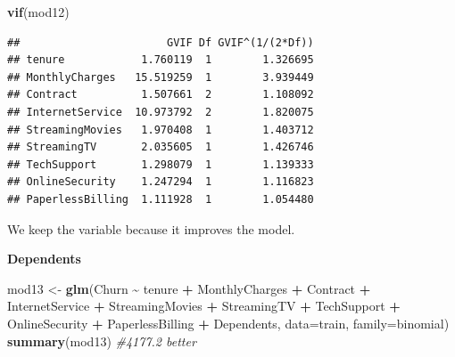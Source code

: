 \documentclass[
  twoside]{article}
\newenvironment{Shaded}{\begin{snugshade}}{\end{snugshade}}
\newcommand{\AttributeTok}[1]{\textcolor[rgb]{0.13,0.29,0.53}{#1}}
\newcommand{\CommentTok}[1]{\textcolor[rgb]{0.56,0.35,0.01}{\textit{#1}}}
\newcommand{\FunctionTok}[1]{\textcolor[rgb]{0.13,0.29,0.53}{\textbf{#1}}}
\newcommand{\NormalTok}[1]{#1}
\newcommand{\OtherTok}[1]{\textcolor[rgb]{0.56,0.35,0.01}{#1}}
\newcommand{\SpecialCharTok}[1]{\textcolor[rgb]{0.81,0.36,0.00}{\textbf{#1}}}
\begin{document}
\begin{Shaded}
\begin{Highlighting}[]
\FunctionTok{vif}\NormalTok{(mod12)}
\end{Highlighting}
\end{Shaded}

\begin{verbatim}
##                       GVIF Df GVIF^(1/(2*Df))
## tenure            1.760119  1        1.326695
## MonthlyCharges   15.519259  1        3.939449
## Contract          1.507661  2        1.108092
## InternetService  10.973792  2        1.820075
## StreamingMovies   1.970408  1        1.403712
## StreamingTV       2.035605  1        1.426746
## TechSupport       1.298079  1        1.139333
## OnlineSecurity    1.247294  1        1.116823
## PaperlessBilling  1.111928  1        1.054480
\end{verbatim}

We keep the variable because it improves the model.

\textbf{Dependents}

\begin{Shaded}
\begin{Highlighting}[]
\NormalTok{mod13 }\OtherTok{\textless{}{-}} \FunctionTok{glm}\NormalTok{(Churn }\SpecialCharTok{\textasciitilde{}}\NormalTok{ tenure }\SpecialCharTok{+}\NormalTok{ MonthlyCharges }\SpecialCharTok{+}\NormalTok{ Contract }\SpecialCharTok{+}\NormalTok{ InternetService }\SpecialCharTok{+} 
\NormalTok{               StreamingMovies }\SpecialCharTok{+}\NormalTok{ StreamingTV }\SpecialCharTok{+}\NormalTok{ TechSupport }\SpecialCharTok{+}\NormalTok{ OnlineSecurity }\SpecialCharTok{+} 
\NormalTok{               PaperlessBilling }\SpecialCharTok{+}\NormalTok{ Dependents, }\AttributeTok{data=}\NormalTok{train, }\AttributeTok{family=}\NormalTok{binomial)}
\FunctionTok{summary}\NormalTok{(mod13) }\CommentTok{\#4177.2 better}
\end{Highlighting}
\end{Shaded}
\end{document}
